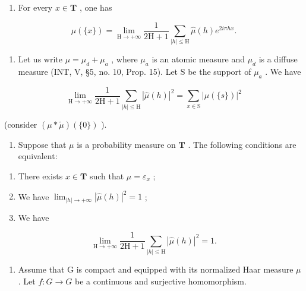 \begin{enumerate}
\def\labelenumi{\alph{enumi})}
\tightlist
\item
  For every \(x \in \mathbf{T}\) , one has
\end{enumerate}

\[
\mu (\{x \}) = \lim _ {\mathrm{H} \rightarrow + \infty} \frac {1}{2 \mathrm{H} + 1} \sum_ {| h | \leqslant \mathrm{H}} \widehat {\mu} (h) e ^ {2 i \pi h x}.
\]

\begin{enumerate}
\def\labelenumi{\alph{enumi})}
\setcounter{enumi}{1}
\tightlist
\item
  Let us write \(\mu = \mu_d + \mu_a\) , where \(\mu_a\) is an atomic measure and \(\mu_d\) is a diffuse measure (INT, V, §5, no. 10, Prop. 15). Let S be the support of \(\mu_a\) . We have
\end{enumerate}

\[
\lim _ {\mathrm{H} \to + \infty} \frac {1}{2 \mathrm{H} + 1} \sum_ {| h | \leqslant \mathrm{H}} | \widehat {\mu} (h) | ^ {2} = \sum_ {x \in \mathrm{S}} | \mu (\{s \}) | ^ {2}
\]

(consider \((\mu * \widetilde{\mu})(\{0\})\) ).

\begin{enumerate}
\def\labelenumi{\alph{enumi})}
\setcounter{enumi}{2}
\tightlist
\item
  Suppose that \(\mu\) is a probability measure on \(\mathbf{T}\) . The following conditions are equivalent:
\end{enumerate}

\begin{enumerate}
\def\labelenumi{(\roman{enumi})}
\item
  There exists \(x \in \mathbf{T}\) such that \(\mu = \varepsilon_x\) ;
\item
  We have \(\lim_{|h|\to+\infty}|\widehat{\mu}(h)|^{2}=1\) ;
\item
  We have
\end{enumerate}

\[
\lim _ {\mathrm{H} \rightarrow + \infty} \frac {1}{2 \mathrm{H} + 1} \sum_ {| h | \leqslant \mathrm{H}} | \widehat {\mu} (h) | ^ {2} = 1.
\]

\begin{enumerate}
\def\labelenumi{\arabic{enumi})}
\setcounter{enumi}{64}
\tightlist
\item
  Assume that G is compact and equipped with its normalized Haar measure \(\mu\) . Let \(f: G \to G\) be a continuous and surjective homomorphism.
\end{enumerate}

